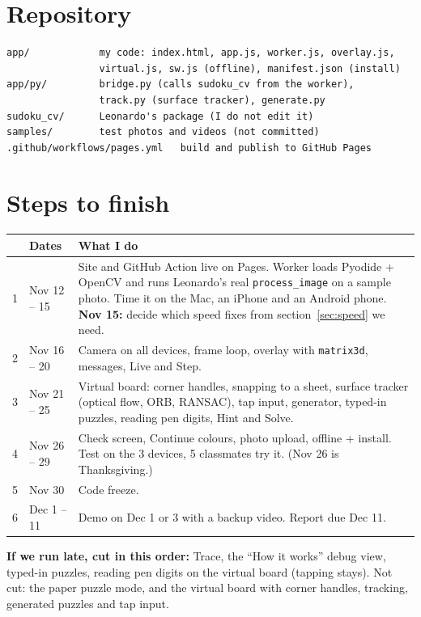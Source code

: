\documentclass[11pt]{article}
\begin{document}
\section{Repository}

\begin{verbatim}
app/            my code: index.html, app.js, worker.js, overlay.js,
                virtual.js, sw.js (offline), manifest.json (install)
app/py/         bridge.py (calls sudoku_cv from the worker),
                track.py (surface tracker), generate.py
sudoku_cv/      Leonardo's package (I do not edit it)
samples/        test photos and videos (not committed)
.github/workflows/pages.yml   build and publish to GitHub Pages
\end{verbatim}

\section{Steps to finish}

\begin{tabularx}{\textwidth}{@{}l>{\raggedright\arraybackslash}p{2.1cm}X@{}}
\toprule
& Dates & What I do \\
\midrule
1 & Nov 12 -- 15 & Site and GitHub Action live on Pages. Worker loads Pyodide + OpenCV and runs
  Leonardo's real \texttt{process\_image} on a sample photo. Time it on the Mac, an iPhone and an
  Android phone. \textbf{Nov 15:} decide which speed fixes from section~\ref{sec:speed} we need. \\
2 & Nov 16 -- 20 & Camera on all devices, frame loop, overlay with \texttt{matrix3d}, messages,
  Live and Step. \\
3 & Nov 21 -- 25 & Virtual board: corner handles, snapping to a sheet, surface tracker (optical
  flow, ORB, RANSAC), tap input, generator, typed-in puzzles, reading pen digits, Hint and Solve. \\
4 & Nov 26 -- 29 & Check screen, Continue colours, photo upload, offline + install. Test on the
  3 devices, 5 classmates try it. (Nov 26 is Thanksgiving.) \\
5 & Nov 30 & Code freeze. \\
6 & Dec 1 -- 11 & Demo on Dec 1 or 3 with a backup video. Report due Dec 11. \\
\bottomrule
\end{tabularx}

\textbf{If we run late, cut in this order:} Trace, the ``How it works'' debug view, typed-in
puzzles, reading pen digits on the virtual board (tapping stays). Not cut: the paper puzzle mode,
and the virtual board with corner handles, tracking, generated puzzles and tap input.
\end{document}
